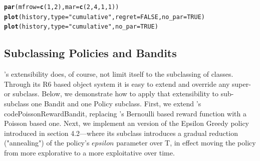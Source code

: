 \documentclass{jss}\usepackage[]{graphicx}\usepackage[]{color}
\makeatletter
\newcommand{\hlnum}[1]{\textcolor[rgb]{0.686,0.059,0.569}{#1}}%
\newcommand{\hlstr}[1]{\textcolor[rgb]{0.192,0.494,0.8}{#1}}%
\newcommand{\hlstd}[1]{\textcolor[rgb]{0.345,0.345,0.345}{#1}}%
\newcommand{\hlkwc}[1]{\textcolor[rgb]{0.333,0.667,0.333}{#1}}%
\newcommand{\hlkwd}[1]{\textcolor[rgb]{0.737,0.353,0.396}{\textbf{#1}}}%
\newenvironment{kframe}{%
 \def\at@end@of@kframe{}%
 \ifinner\ifhmode%
  \def\at@end@of@kframe{\end{minipage}}%
  \begin{minipage}{\columnwidth}%
 \fi\fi%
 \def\FrameCommand##1{\hskip\@totalleftmargin \hskip-\fboxsep
 \colorbox{shadecolor}{##1}\hskip-\fboxsep
     \hskip-\linewidth \hskip-\@totalleftmargin \hskip\columnwidth}%
 \MakeFramed {\advance\hsize-\width
   \@totalleftmargin\z@ \linewidth\hsize
   \@setminipage}}%
 {\par\unskip\endMakeFramed%
 \at@end@of@kframe}
\newenvironment{knitrout}{}{} %
\makeatother
\begin{document}
\begin{knitrout}
\begin{kframe}
\begin{alltt}
\hlkwd{par}\hlstd{(}\hlkwc{mfrow} \hlstd{=} \hlkwd{c}\hlstd{(}\hlnum{1}\hlstd{,} \hlnum{2}\hlstd{),} \hlkwc{mar} \hlstd{=} \hlkwd{c}\hlstd{(}\hlnum{2}\hlstd{,}\hlnum{4}\hlstd{,}\hlnum{1}\hlstd{,}\hlnum{1}\hlstd{))}
\hlkwd{plot}\hlstd{(history,} \hlkwc{type} \hlstd{=} \hlstr{"cumulative"}\hlstd{,} \hlkwc{regret} \hlstd{=} \hlnum{FALSE}\hlstd{,} \hlkwc{no_par} \hlstd{=} \hlnum{TRUE}\hlstd{)}
\hlkwd{plot}\hlstd{(history,} \hlkwc{type} \hlstd{=} \hlstr{"cumulative"}\hlstd{,} \hlkwc{no_par} \hlstd{=} \hlnum{TRUE}\hlstd{)}
\end{alltt}
\end{kframe}
\end{knitrout}
\begin{center}

\end{center}

\subsection{Subclassing Policies and Bandits}

's extensibility does, of course, not limit itself to the subclassing of  classes. Through its R6 based object system it is easy to extend and override any  super- or subclass. Below, we demonstrate how to apply that extensibility to sub-subclass one Bandit and one Policy subclass.
First, we extend 's code{PoissonRewardBandit}, replacing 's Bernoulli based reward function with a Poisson based one. Next, we implement an  version of the Epsilon Greedy policy introduced in section 4.2---where its  subclass introduces a gradual reduction ("annealing") of the policy's $epsilon$ parameter over T, in effect moving the policy from more explorative to a more exploitative over time.
\end{document}
